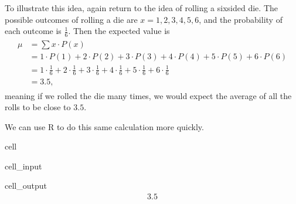 \documentclass[letterpaper,10pt,english]{jupyterBook}
\begin{document}
\sphinxAtStartPar
To illustrate this idea, again return to the idea of rolling a six\sphinxhyphen{}sided die. The possible outcomes of rolling a die are \(x = 1, 2, 3, 4, 5, 6\), and the probability of each outcome is \(\frac{1}{6}\). Then the expected value is
\begin{equation*}
\begin{split}
\begin{align}
\mu &= \sum x \cdot P(x) \\
&= 1\cdot P(1) + 2 \cdot P(2) + 3 \cdot P(3) + 4 \cdot P(4) + 5 \cdot P(5) + 6 \cdot P(6) \\
&= 1\cdot \frac{1}{6} + 2 \cdot \frac{1}{6} + 3 \cdot \frac{1}{6} + 4 \cdot \frac{1}{6} + 5 \cdot \frac{1}{6} + 6 \cdot \frac{1}{6} \\
&= 3.5,
\end{align}
\end{split}
\end{equation*}
\sphinxAtStartPar
meaning if we rolled the die many times, we would expect the average of all the rolls to be close to \(3.5\).

\sphinxAtStartPar
We can use R to do this same calculation more quickly.

\begin{sphinxuseclass}{cell}\begin{sphinxVerbatimInput}

\begin{sphinxuseclass}{cell_input}
\begin{sphinxVerbatim}[commandchars=\\\{\}]

\end{sphinxVerbatim}

\end{sphinxuseclass}\end{sphinxVerbatimInput}
\begin{sphinxVerbatimOutput}

\begin{sphinxuseclass}{cell_output}\begin{equation*}
\begin{split}3.5\end{split}
\end{equation*}
\end{sphinxuseclass}\end{sphinxVerbatimOutput}

\end{sphinxuseclass}
\end{document}
